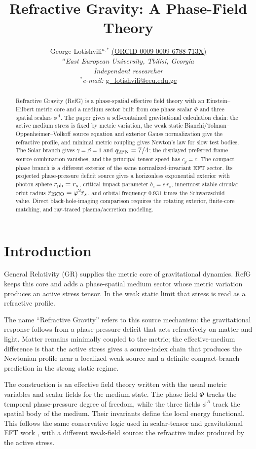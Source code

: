 \documentclass[12pt,a4paper]{article}
\title{Refractive Gravity: A Phase-Field Theory}
\author{George Lotishvili$^{a,*}$ \href{https://orcid.org/0009-0009-6788-713X}{(ORCID 0009-0009-6788-713X)}\\[0.5em]
$^{a}$\textit{East European University, Tbilisi, Georgia}\\
\textit{Independent researcher}\\[0.5em]
$^{*}$\textit{e-mail:} \href{mailto:g_lotishvili@eeu.edu.ge}{g\_lotishvili@eeu.edu.ge}}
\date{}
\begin{document}
\maketitle

\begin{abstract}
Refractive Gravity (RefG) is a phase-spatial effective field theory with an Einstein--Hilbert metric core and a medium sector built from one phase scalar $\Phi$ and three spatial scalars $\phi^A$. The paper gives a self-contained gravitational calculation chain: the active medium stress is fixed by metric variation, the weak static Bianchi/Tolman--Oppenheimer--Volkoff source equation and exterior Gauss normalization give the refractive profile, and minimal metric coupling gives Newton's law for slow test bodies. The Solar branch gives $\gamma=\beta=1$ and $q_{2{\rm PN}}=7/4$; the displayed preferred-frame source combination vanishes, and the principal tensor speed has $c_g=c$. The compact phase branch is a different exterior of the same normalized-invariant EFT sector. Its projected phase-pressure deficit source gives a horizonless exponential exterior with photon sphere $r_{\rm ph}=r_s$, critical impact parameter $b_c=e\,r_s$, innermost stable circular orbit radius $r_{\rm ISCO}=\varphi^2r_s$, and orbital frequency $0.931$ times the Schwarzschild value. Direct black-hole-imaging comparison requires the rotating exterior, finite-core matching, and ray-traced plasma/accretion modeling.
\end{abstract}

\section{Introduction}

General Relativity (GR) supplies the metric core of gravitational dynamics. RefG keeps this core and adds a phase-spatial medium sector whose metric variation produces an active stress tensor. In the weak static limit that stress is read as a refractive profile.

The name ``Refractive Gravity'' refers to this source mechanism: the gravitational response follows from a phase-pressure deficit that acts refractively on matter and light. Matter remains minimally coupled to the metric; the effective-medium difference is that the active stress gives a source-index chain that produces the Newtonian profile near a localized weak source and a definite compact-branch prediction in the strong static regime.

The construction is an effective field theory written with the usual metric variables and scalar fields for the medium state. The phase field $\Phi$ tracks the temporal phase-pressure degree of freedom, while the three fields $\phi^A$ track the spatial body of the medium. Their invariants define the local energy functional. This follows the same conservative logic used in scalar-tensor and gravitational EFT work \cite{Horndeski1974,Gubitosi2013,BelliniSawicki2014,Deffayet2009,Kobayashi2011,Cheung2008}, with a different weak-field source: the refractive index produced by the active stress.
\end{document}
